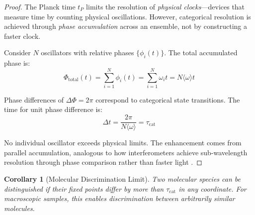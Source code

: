 \documentclass[twocolumn,10pt,a4paper]{article}
\newtheorem{corollary}[theorem]{Corollary}
\begin{document}
\begin{proof}
The Planck time $t_P$ limits the resolution of \emph{physical clocks}---devices that measure time by counting physical oscillations. However, categorical resolution is achieved through \emph{phase accumulation} across an ensemble, not by constructing a faster clock.

Consider $N$ oscillators with relative phases $\{\phi_i(t)\}$. The total accumulated phase is:
\begin{equation}
\Phi_{\text{total}}(t) = \sum_{i=1}^N \phi_i(t) = \sum_{i=1}^N \omega_i t = N \langle \omega \rangle t
\end{equation}

Phase differences of $\Delta \Phi = 2\pi$ correspond to categorical state transitions. The time for unit phase difference is:
\begin{equation}
\Delta t = \frac{2\pi}{N \langle \omega \rangle} = \tau_{\text{cat}}
\end{equation}

No individual oscillator exceeds physical limits. The enhancement comes from parallel accumulation, analogous to how interferometers achieve sub-wavelength resolution through phase comparison rather than faster light \citep{michelson1887relative}.
\end{proof}

\begin{corollary}[Molecular Discrimination Limit]
Two molecular species can be distinguished if their fixed points differ by more than $\tau_{\text{cat}}$ in any coordinate. For macroscopic samples, this enables discrimination between arbitrarily similar molecules.
\end{corollary}
\end{document}
